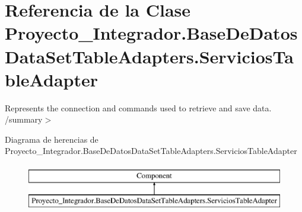 \section{Referencia de la Clase Proyecto\-\_\-\-Integrador.\-Base\-De\-Datos\-Data\-Set\-Table\-Adapters.\-Servicios\-Table\-Adapter}
\label{class_proyecto___integrador_1_1_base_de_datos_data_set_table_adapters_1_1_servicios_table_adapter}


Represents the connection and commands used to retrieve and save data. /summary$>$  


Diagrama de herencias de Proyecto\-\_\-\-Integrador.\-Base\-De\-Datos\-Data\-Set\-Table\-Adapters.\-Servicios\-Table\-Adapter\begin{figure}[H]
\begin{center}
\leavevmode
\includegraphics[height=2.000000cm]{class_proyecto___integrador_1_1_base_de_datos_data_set_table_adapters_1_1_servicios_table_adapter}
\end{center}
\end{figure}

